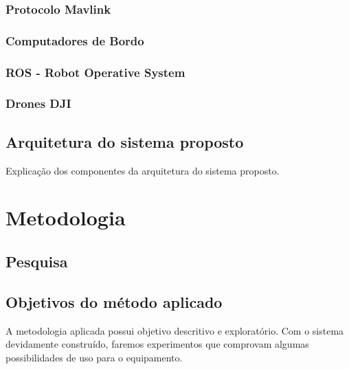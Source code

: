 \documentclass[12pt,a4paper,oneside]{book}
\begin{document}
\subsection{Protocolo Mavlink}

\subsection{Computadores de Bordo}

\subsection{ROS - Robot Operative System}

\subsection{Drones DJI}

\section{Arquitetura do sistema proposto}

Explicação dos componentes da arquitetura do sistema proposto.
%



\chapter{Metodologia}
\label{chapter:Metodologia}
%
\thispagestyle{empty} 
%
\section{Pesquisa}


%
\section{Objetivos do método aplicado}
A metodologia aplicada possui objetivo descritivo e exploratório. Com o sistema devidamente construído, faremos experimentos que comprovam algumas possibilidades de uso para o equipamento.
\end{document}
